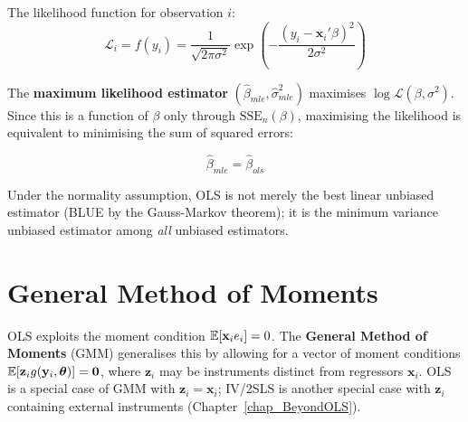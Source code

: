 The likelihood function for observation $i$:
\begin{equation}
  \mathcal{L}_i = f(y_i) = \frac{1}{\sqrt{2\pi\sigma^2}}
  \exp\!\left(-\frac{(y_i - \mathbf{x}_i'\beta)^2}{2\sigma^2}\right)
\end{equation}

The \textbf{maximum likelihood estimator} $(\hat\beta_{mle}, \hat\sigma^2_{mle})$ maximises
$\log\mathcal{L}(\beta,\sigma^2)$. Since this is a function of $\beta$ only
through $\text{SSE}_n(\beta)$, maximising the likelihood is equivalent to
minimising the sum of squared errors:

\begin{tcolorbox}[keyresult]
\begin{equation}
  \hat\beta_{mle} = \hat\beta_{ols}
\end{equation}
\end{tcolorbox}

Under the normality assumption, OLS is not merely the best linear unbiased
estimator (BLUE by the Gauss-Markov theorem); it is the minimum variance
unbiased estimator among \emph{all} unbiased estimators.


\section{General Method of Moments}
\label{sec_GMM}

OLS exploits the moment condition $\mathbb{E}[\mathbf{x}_i e_i] = 0$.
The \textbf{General Method of Moments} (GMM) generalises this by
allowing for a vector of moment conditions $\mathbb{E}[\mathbf{z}_i g(\mathbf{y}_i,
\boldsymbol{\theta})] = \mathbf{0}$, where $\mathbf{z}_i$ may be instruments
distinct from regressors $\mathbf{x}_i$. OLS is a special case of GMM with
$\mathbf{z}_i = \mathbf{x}_i$; IV/2SLS is another special case with
$\mathbf{z}_i$ containing external instruments (Chapter~\ref{chap_BeyondOLS}).


\renewcommand\bibname{Further reading}
\begin{subappendices}


\end{subappendices}
